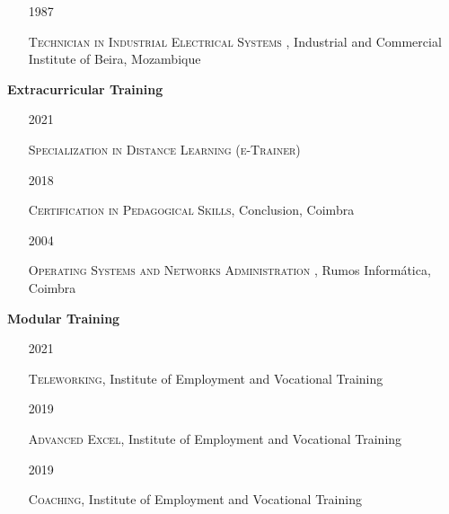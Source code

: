 \documentclass[10pt,a4paper,oneside]{article}
\newlength{\datewidth}
\newlength{\textindent}
\begin{document}
\begin{itemize}
		\item[\hspace{\datewidth}\scriptsize 1987] \parbox[t]{\dimexpr\linewidth-\datewidth-\textindent}{\textsc{Technician in Industrial Electrical Systems }, Industrial and Commercial Institute of Beira, Mozambique}
	\end{itemize}
	
	\vspace{5mm}
	
	\textbf{\hspace{\textindent}Extracurricular Training}
	\begin{itemize}
		\item[\hspace{\datewidth}\scriptsize 2021] \parbox[t]{\dimexpr\linewidth-\datewidth-\textindent}{\textsc{Specialization in Distance Learning (e-Trainer)}}
		\item[\hspace{\datewidth}\scriptsize 2018] \parbox[t]{\dimexpr\linewidth-\datewidth-\textindent}{\textsc{Certification in Pedagogical Skills}, Conclusion, Coimbra}
		\item[\hspace{\datewidth}\scriptsize 2004] \parbox[t]{\dimexpr\linewidth-\datewidth-\textindent}{\textsc{Operating Systems and Networks Administration }, Rumos Informática, Coimbra}
	\end{itemize}
	
	\vspace{5mm}
	
	\textbf{\hspace{\textindent}Modular Training}
	\begin{itemize}
		\item[\hspace{\datewidth}\scriptsize 2021] \parbox[t]{\dimexpr\linewidth-\datewidth-\textindent}{\textsc{Teleworking}, Institute of Employment and Vocational Training}
		\item[\hspace{\datewidth}\scriptsize 2019] \parbox[t]{\dimexpr\linewidth-\datewidth-\textindent}{\textsc{Advanced Excel}, Institute of Employment and Vocational Training}
		\item[\hspace{\datewidth}\scriptsize 2019] \parbox[t]{\dimexpr\linewidth-\datewidth-\textindent}{\textsc{Coaching}, Institute of Employment and Vocational Training}

	\end{itemize}
	
\end{document}
